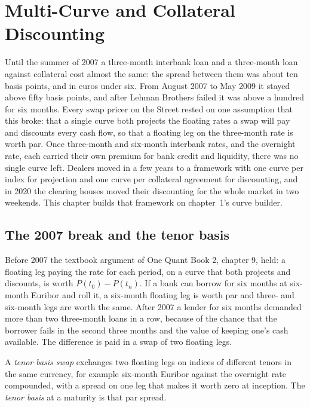 \chapter{Multi-Curve and Collateral Discounting}\label{ch:rc:multi-curve-and-collateral-discounting}

Until the summer of 2007 a three-month interbank loan and a three-month loan
against collateral cost almost the same: the spread between them was about ten
basis points, and in euros under six. From August 2007 to May 2009 it stayed
above fifty basis points, and after Lehman Brothers failed it was above a
hundred for six months. Every swap pricer on the Street rested on one
assumption that this broke: that a single curve both projects the floating
rates a swap will pay and discounts every cash flow, so that a floating leg on
the three-month rate is worth par. Once three-month and six-month interbank
rates, and the overnight rate, each carried their own premium for bank credit
and liquidity, there was no single curve left. Dealers moved in a few years to
a framework with one curve per index for projection and one curve per
collateral agreement for discounting, and in 2020 the clearing houses moved
their discounting for the whole market in two weekends. This chapter builds
that framework on chapter~1's curve builder.

\section{The 2007 break and the tenor basis}

Before 2007 the textbook argument of One Quant Book 2, chapter 9, held: a
floating leg paying the rate for each period, on a curve that both projects
and discounts, is worth $P(t_0)-P(t_n)$. If a bank can borrow for six months
at six-month Euribor and roll it, a six-month floating leg is worth par and
three- and six-month legs are worth the same. After 2007 a lender for six
months demanded more than two three-month loans in a row, because of the
chance that the borrower fails in the second three months and the value of
keeping one's cash available. The difference is paid in a swap of two
floating legs.

\begin{definition}\label{def:rc:multi-curve-and-collateral-discounting:basis}
A \emph{tenor basis swap} exchanges two floating legs
on indices of different tenors in the same currency, for example six-month
Euribor against the overnight rate compounded, with a spread on one leg that
makes it worth zero at inception. The \emph{tenor basis} at
a maturity is that par spread.
\end{definition}

